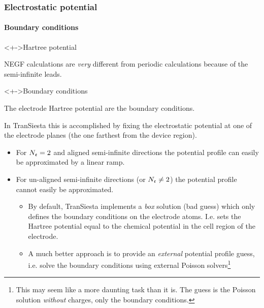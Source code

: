 \begin{frame}
  \frametitle{Electrostatic potential}
  \framesubtitle{Boundary conditions}

  \begin{block}<+->{Hartree potential}

    NEGF calculations are \emph{very} different from periodic calculations because of the
    semi-infinite leads.

  \end{block}

  \begin{block}<+->{Boundary conditions}

    The electrode Hartree potential are the boundary conditions.

    In TranSiesta this is accomplished by fixing the electrostatic potential at one of the
    electrode planes (the one farthest from the device region).

    \begin{itemize}
      \item For $N_{\mathfrak{e}}=2$ and aligned semi-infinite directions the potential profile can
      easily be approximated by a linear ramp.

      \item For un-aligned semi-infinite directions (or $N_{\mathfrak{e}}\neq2$) the potential
      profile cannot easily be approximated.

      \begin{itemize}[<+->]
        \item By default, TranSiesta implements a \emph{box} solution (bad guess) which
        only defines the boundary conditions on the electrode atoms. I.e. sets the Hartree
        potential equal to the chemical potential in the cell region of the electrode.

        \item A much better approach is to provide an \emph{external} potential profile
        guess, i.e. solve the boundary conditions using external Poisson
        solvers\footnote{This may seem like a more daunting task than it is. The guess is
            the Poisson solution \emph{without} charges, only the boundary conditions.}

      \end{itemize}
    \end{itemize}
    
  \end{block}
  
\end{frame}


